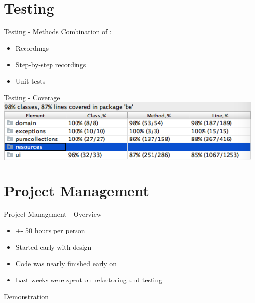 \documentclass[10pt]{beamer}
\begin{document}
\section{Testing}

\begin{frame}[fragile]{Testing - Methods}
Combination of :
\begin{itemize}
\item Recordings
\item Step-by-step recordings
\item Unit tests
\end{itemize}
\end{frame}

\begin{frame}[fragile]{Testing - Coverage}
\includegraphics[width=1\textwidth]{coverage}
\end{frame}

\section{Project Management}
%

\begin{frame}[fragile]{Project Management - Overview}
\begin{itemize}
\item +- 50 hours per person
\item Started early with design
\item Code was nearly finished early on
\item Last weeks were spent on refactoring and testing
\end{itemize}
\end{frame}

{
\begin{frame}[standout]
  Demonstration
\end{frame}
}
\end{document}
